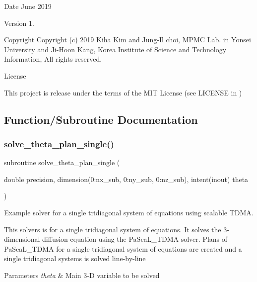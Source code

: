 \begin{DoxyDate}{Date}
June 2019 
\end{DoxyDate}
\begin{DoxyVersion}{Version}
1. 
\end{DoxyVersion}
\begin{DoxyParagraph}{Copyright}
Copyright (c) 2019 Kiha Kim and Jung-\/\+Il choi, M\+P\+MC Lab. in Yonsei University and Ji-\/\+Hoon Kang, Korea Institute of Science and Technology Information, All rights reserved. 
\end{DoxyParagraph}
\begin{DoxyParagraph}{License }

\end{DoxyParagraph}
This project is release under the terms of the M\+IT License (see L\+I\+C\+E\+N\+SE in ) 

\subsection{Function/\+Subroutine Documentation}
\mbox{\label{solve__theta__plan__single_8f90_a53ef6756822306f33a47be6a66232862}} 
\subsubsection{\texorpdfstring{solve\_theta\_plan\_single()}{solve\_theta\_plan\_single()}}
{\footnotesize\ttfamily subroutine solve\+\_\+theta\+\_\+plan\+\_\+single (\begin{DoxyParamCaption}\item[{double precision, dimension(0\+:nx\+\_\+sub, 0\+:ny\+\_\+sub, 0\+:nz\+\_\+sub), intent(inout)}]{theta }\end{DoxyParamCaption})}



Example solver for a single tridiagonal system of equations using scalable T\+D\+MA. 

This solvers is for a single tridiagonal system of equations. It solves the 3-\/dimensional diffusion equation using the Pa\+Sca\+L\+\_\+\+T\+D\+MA solver. Plans of Pa\+Sca\+L\+\_\+\+T\+D\+MA for a single tridiagonal system of equations are created and a single tridiagonal systems is solved line-\/by-\/line 
\begin{DoxyParams}{Parameters}
{\em theta} & Main 3-\/D variable to be solved \\
\hline
\end{DoxyParams}


